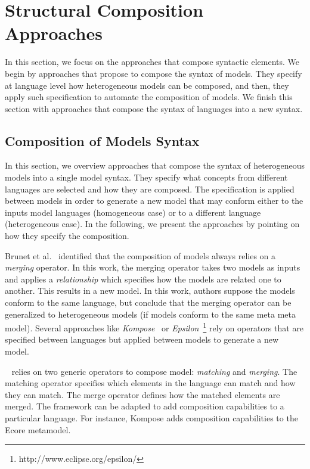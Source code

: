 \section{Structural Composition Approaches}
In this section, we focus on the approaches that compose syntactic elements. We begin by approaches that propose to compose the syntax of models. They specify at language level how heterogeneous models can be composed, and then, they apply such specification to automate the composition of models. We finish this section with approaches that compose the syntax of languages into a new syntax. 

 	
 \subsection{Composition of Models Syntax}

In this section, we overview approaches that compose the syntax of heterogeneous models into a single model syntax. They specify what concepts from different languages are selected and how they are composed. The specification is applied between models in order to generate a new model that may conform either to the inputs model languages (homogeneous case) or to a different language (heterogeneous case). In the following, we present the approaches by pointing on how they specify the composition.   

Brunet et al.~\cite{mergemanifest} identified that the composition of models always relies on a \emph{merging} operator. In this work, the merging operator takes two models as inputs and applies a \emph{relationship} which specifies how the models are related one to another. This results in a new model. In this work, authors suppose the models conform to the same language, but conclude that the merging operator can be generalized to heterogeneous models (if models conform to the same meta meta model). Several approaches like \emph{Kompose}~\cite{kompose} or \emph{Epsilon}~\cite{epsilon}\footnote{http://www.eclipse.org/epsilon/} rely on operators that are specified between languages but applied between models to generate a new model. 
    		
~\cite{kompose} relies on two generic operators to compose model: \emph{matching} and \emph{merging}. The matching operator specifies which elements in the language can match and how they can match. The merge operator defines how the matched elements are merged. The framework can be adapted to add composition capabilities to a particular language. For instance, Kompose adds composition capabilities to the Ecore metamodel. 
    		
